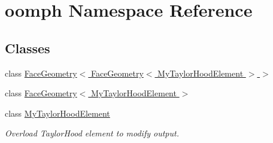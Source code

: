\hypertarget{namespaceoomph}{}\section{oomph Namespace Reference}
\label{namespaceoomph}
\subsection*{Classes}
\begin{DoxyCompactItemize}
\item 
class \hyperlink{classoomph_1_1FaceGeometry_3_01FaceGeometry_3_01MyTaylorHoodElement_01_4_01_4}{Face\+Geometry$<$ Face\+Geometry$<$ My\+Taylor\+Hood\+Element $>$ $>$}
\item 
class \hyperlink{classoomph_1_1FaceGeometry_3_01MyTaylorHoodElement_01_4}{Face\+Geometry$<$ My\+Taylor\+Hood\+Element $>$}
\item 
class \hyperlink{classoomph_1_1MyTaylorHoodElement}{My\+Taylor\+Hood\+Element}
\begin{DoxyCompactList}\small\item\em Overload Taylor\+Hood element to modify output. \end{DoxyCompactList}\end{DoxyCompactItemize}
